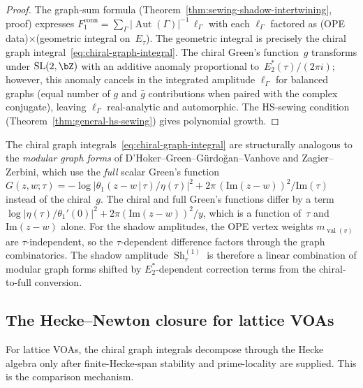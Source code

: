 \begin{proof}
The graph-sum formula
(Theorem~\ref{thm:sewing-shadow-intertwining}, proof)
expresses $F_1^{\mathrm{conn}} = \sum_\Gamma
|\operatorname{Aut}(\Gamma)|^{-1}\,\ell_\Gamma$ with each
$\ell_\Gamma$ factored as (OPE data)$\times$(geometric integral
on~$E_\tau$). The geometric integral is precisely the
chiral graph integral~\eqref{eq:chiral-graph-integral}.
The chiral Green's function~$g$ transforms under
$\mathrm{SL}(2,\bZ)$ with an additive anomaly proportional
to~$E_2^*(\tau)/(2\pi i)$; however, this anomaly cancels in the
integrated amplitude $\ell_\Gamma$ for balanced graphs (equal
number of $g$ and $\bar{g}$ contributions when paired with
the complex conjugate), leaving $\ell_\Gamma$ real-analytic
and automorphic. The HS-sewing condition
(Theorem~\ref{thm:general-hs-sewing}) gives polynomial growth.
\end{proof}

\begin{remark}%
\label{rem:mgf-relation}%
%
The chiral graph integrals~\eqref{eq:chiral-graph-integral}
are structurally analogous to the \emph{modular graph forms}
of D'Hoker--Green--G\"urdo\u{g}an--Vanhove and
Zagier--Zerbini, which use the \emph{full} scalar Green's function
$G(z,w;\tau) = -\log\lvert\theta_1(z{-}w\,|\,\tau)/
\eta(\tau)\rvert^2 + 2\pi\,(\mathrm{Im}(z{-}w))^2/\mathrm{Im}(\tau)$
instead of the chiral~$g$. The chiral and full Green's functions
differ by a term $\log\lvert\eta(\tau)/\theta_1'(0)\rvert^2
+ 2\pi(\mathrm{Im}(z{-}w))^2/y$, which is a function
of~$\tau$ and $\mathrm{Im}(z{-}w)$ alone. For the shadow
amplitudes, the OPE vertex weights $m_{\operatorname{val}(v)}$
are $\tau$-independent, so the $\tau$-dependent difference
factors through the graph combinatorics. The shadow amplitude
$\operatorname{Sh}_r^{(1)}$ is therefore a linear combination of
modular graph forms shifted by $E_2^*$-dependent correction
terms from the chiral-to-full conversion.
\end{remark}

\subsection{The Hecke--Newton closure for lattice VOAs}%
\label{sec:hecke-newton-lattice}

For lattice VOAs, the chiral graph integrals decompose through
the Hecke algebra only after finite-Hecke-span stability and
prime-locality are supplied. This is the comparison mechanism.

